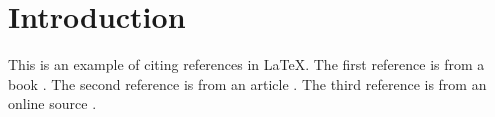 \documentclass[a4paper,12pt]{article}
\begin{document}
    \thispagestyle{empty}  %
    \null
    \newpage
    \ClearShipoutPictureBG

    \tableofcontents  %

    \section{Introduction}
    This is an example of citing references in LaTeX. The first reference is from a book \citep{ref1}. The second reference is from an article \citep{ref2}. The third reference is from an online source \citep{ref3}.

\end{document}
